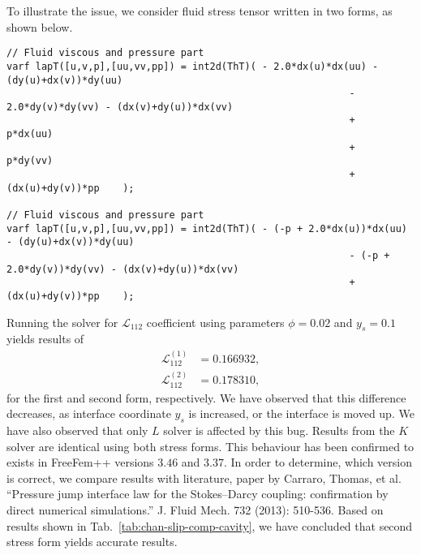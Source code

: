 \documentclass[12pt,a4paper]{article}
\begin{document}
To illustrate the issue, we consider fluid stress tensor written in two forms, as shown below.
\begin{lstlisting}
// Fluid viscous and pressure part                                                                                                                            
varf lapT([u,v,p],[uu,vv,pp]) = int2d(ThT)( - 2.0*dx(u)*dx(uu) - (dy(u)+dx(v))*dy(uu)
                                                           - 2.0*dy(v)*dy(vv) - (dx(v)+dy(u))*dx(vv)
                                                           +         p*dx(uu)
                                                           +         p*dy(vv)
                                                           + (dx(u)+dy(v))*pp    );
                                                           
// Fluid viscous and pressure part                                                                                                                            
varf lapT([u,v,p],[uu,vv,pp]) = int2d(ThT)( - (-p + 2.0*dx(u))*dx(uu) - (dy(u)+dx(v))*dy(uu)
                                                           - (-p + 2.0*dy(v))*dy(vv) - (dx(v)+dy(u))*dx(vv)
                                                           + (dx(u)+dy(v))*pp    );
\end{lstlisting}

Running the solver for $\mathcal{L}_{112}$ coefficient using parameters $\phi = 0.02$ and $y_s = 0.1$ yields results of
\begin{align}
\mathcal{L}^{(1)}_{112} & = 0.166932, \\
\mathcal{L}^{(2)}_{112} & = 0.178310,
\end{align}
for the first and second form, respectively.
We have observed that this difference decreases, as interface coordinate 
$y_s$ is increased, or the interface is moved up. 
We have also observed that only $L$ solver is
affected by this bug. Results from the $K$ solver are identical using both stress forms.
This behaviour has been confirmed to exists in FreeFem++ versions $3.46$ and $3.37$. In order to determine, which version is correct, we compare results with literature, paper by Carraro, Thomas,
et al. ``Pressure jump interface law for the Stokes--Darcy coupling: confirmation by direct
numerical simulations.'' J. Fluid Mech. 732 (2013): 510-536. Based on results shown in
Tab.~\ref{tab:chan-slip-comp-cavity}, we have concluded that second stress form yields
accurate results.
\end{document}
